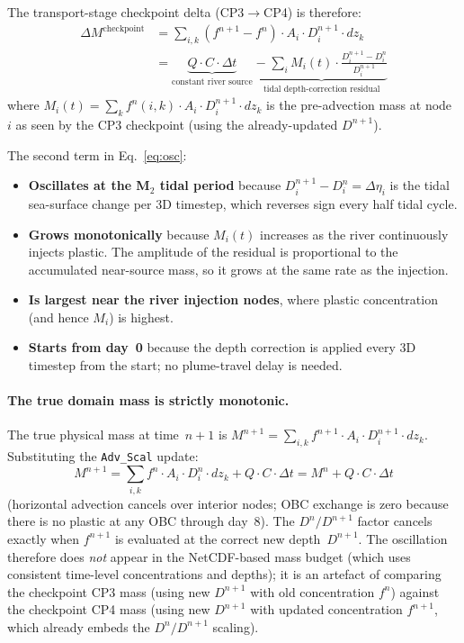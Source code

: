 \documentclass[11pt]{article}
\begin{document}
The transport-stage checkpoint delta (CP3$\to$CP4) is therefore:
\begin{align}
  \Delta M^{\text{checkpoint}} &=
    \sum_{i,k}(f^{n+1}-f^n)\cdot A_i\cdot D_i^{n+1}\cdot dz_k \nonumber\\
  &= \underbrace{Q\cdot C\cdot\Delta t}_{\text{constant river source}}
     \;\underbrace{-\;\sum_i M_i(t)\cdot\frac{D_i^{n+1}-D_i^n}{D_i^{n+1}}}_{\text{tidal depth-correction residual}}
  \label{eq:osc}
\end{align}
where $M_i(t)=\sum_k f^n(i,k)\cdot A_i\cdot D_i^{n+1}\cdot dz_k$ is the
pre-advection mass at node~$i$ as seen by the CP3 checkpoint
(using the already-updated $D^{n+1}$).

The second term in Eq.~\eqref{eq:osc}:
\begin{itemize}
  \item \textbf{Oscillates at the M$_2$ tidal period} because
        $D_i^{n+1}-D_i^n = \Delta\eta_i$ is the tidal sea-surface change
        per 3D timestep, which reverses sign every half tidal cycle.
  \item \textbf{Grows monotonically} because $M_i(t)$ increases as the
        river continuously injects plastic.  The amplitude of the
        residual is proportional to the accumulated near-source mass,
        so it grows at the same rate as the injection.
  \item \textbf{Is largest near the river injection nodes}, where
        plastic concentration (and hence $M_i$) is highest.
  \item \textbf{Starts from day~0} because the depth correction is
        applied every 3D timestep from the start; no plume-travel
        delay is needed.
\end{itemize}

\paragraph{The true domain mass is strictly monotonic.}
The true physical mass at time~$n+1$ is
$M^{n+1} = \sum_{i,k} f^{n+1}\cdot A_i\cdot D_i^{n+1}\cdot dz_k$.
Substituting the \texttt{Adv\_Scal} update:
\[
  M^{n+1} = \sum_{i,k} f^n\cdot A_i\cdot D_i^n\cdot dz_k + Q\cdot C\cdot\Delta t
           = M^n + Q\cdot C\cdot\Delta t
\]
(horizontal advection cancels over interior nodes; OBC exchange is zero
because there is no plastic at any OBC through day~8).
The $D^n/D^{n+1}$ factor cancels exactly when $f^{n+1}$ is evaluated
at the correct new depth~$D^{n+1}$.  The oscillation therefore does
\emph{not} appear in the NetCDF-based mass budget (which uses
consistent time-level concentrations and depths); it is an artefact
of comparing the checkpoint CP3 mass (using new $D^{n+1}$ with old
concentration $f^n$) against the checkpoint CP4 mass (using new $D^{n+1}$
with updated concentration $f^{n+1}$, which already embeds the
$D^n/D^{n+1}$ scaling).
\end{document}
